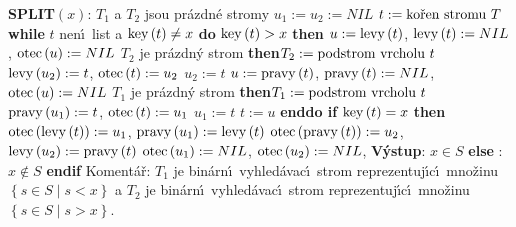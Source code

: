 {\bf SPLIT$\left(x\right)$}:\newline 
$T_1$ a $T_2$ jsou pr\'azdn\'e stromy\newline 
$u_1:=u_2:=NIL$\newline 
$t:=\text{\rm ko\v ren stromu }T$\newline 
{\bf while} $t$ nen\'\i\ list a $\operatorname{key}\left(t\right)\ne x$ {\bf do\newline}
\phantom{---}{\bf if} $\operatorname{key}\left(t\right)>x$ {\bf then\newline 
\phantom{------}$u:=\operatorname{levy}\left(t\right)$}, $\operatorname{levy}\left(t\right):=NIL$, $\operatorname{otec}\left(u\right):=NIL$\newline 
\phantom{------}{\bf if} $T_2$ je pr\'azdn\'y strom {\bf then}\newline \phantom{---------}$T_2:=\text{\rm podstrom vrcholu }t$\newline
\phantom{------}{\bf else}\newline 
\phantom{---------}$\operatorname{levy}\left(u_2\right):=t$, $\operatorname{otec}\left(t\right):=u_2$\newline 
\phantom{------}{\bf endif}\newline
\phantom{------}$u_2:=t$\newline 
\phantom{---}{\bf else}\newline 
\phantom{------}$u:=\operatorname{pravy}\left(t\right)$, $\operatorname{pravy}\left(t\right):=NIL$, $\operatorname{otec}\left(u\right):=NIL$\newline
\phantom{------}{\bf if} $T_1$ je pr\'azdn\'y strom {\bf then}\newline \phantom{---------}$T_1:=\text{\rm podstrom vrcholu }t$\newline
\phantom{------}{\bf else}\newline 
\phantom{---------}$\operatorname{pravy}\left(u_1\right):=t$, $\operatorname{otec}\left(t\right):=u_1$\newline 
\phantom{------}{\bf endif}\newline
\phantom{------}$u_1:=t$\newline 
\phantom{---}{\bf endif}\newline 
\phantom{---}$t:=u$\newline 
{\bf enddo\newline 
if} $\operatorname{key}\left(t\right)=x$ {\bf then}\newline 
\phantom{---}$\operatorname{otec}\left(\operatorname{levy}\left(t\right)\right):=u_1$, $\operatorname{pravy}\left(u_1\right):=\operatorname{levy}\left(t\right)$\newline 
\phantom{---}$\operatorname{otec}\left(\operatorname{pravy}\left(t\right)\right):=u_2$, $\operatorname{levy}\left(u_2\right):=\operatorname{pravy}\left(t\right)$\newline 
\phantom{---}$\operatorname{otec}\left(u_1\right):=NIL$, $\operatorname{otec}\left(u_2\right):=NIL$, {\bf V\'ystup}: $x\in S$\newline 
{\bf else}\newline 
\phantom{---}{\bf V\'ystup}: $x\notin S$\newline 
{\bf endif\newline }
Koment\'a\v r: $T_1$ je bin\'arn\'\i\ vyhled\'avac\'\i\ strom reprezentuj\'\i c\'\i\ 
mno\-\v zi\-nu 
$\left\{s\in S\mid s<x\right\}$ a $T_2$ je bin\'arn\'\i\ vyhled\'avac\'\i\ strom 
reprezentuj\'\i c\'\i\ mno\v zinu $\left\{s\in S\mid s>x\right\}$.
\medskip

